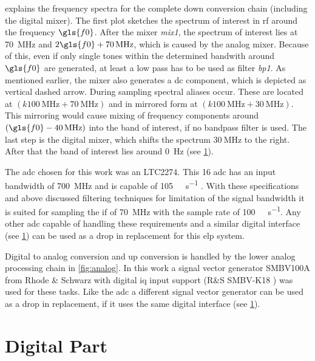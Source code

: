 \documentclass[12pt,a4paper,parskip=full,abstract=true,BCOR=12mm,twoside,open=right]{scrreprt}
\def\device#1{\textit{#1}}
\begin{document}
 explains the frequency spectra for the complete down
conversion chain (including the digital mixer). The first plot sketches the
spectrum of interest in \gls{rf} around the frequency $\gls{f0}$. After the mixer \device{mix1}, the
spectrum of interest lies at \SI{70}{\mega\hertz} and $2\gls{f0} + \SI{70}{\mega\hertz}$,
which is caused by the analog mixer. Because of this, even if only single tones
within the determined bandwith around $\gls{f0}$ are generated, at least a low pass
has to be used as filter \device{bp1}. As mentioned earlier, the mixer also generates a \gls{dc} component, which is depicted as vertical dashed arrow. During sampling spectral aliases occur. These
are located at $(k \SI{100}{\mega\hertz} + \SI{70}{\mega\hertz})$ and in mirrored form at
$(k \SI{100}{\mega\hertz} + \SI{30}{\mega\hertz})$. This mirroring would cause mixing
of frequency components around $(\gls{f0} - \SI{40}{\mega\hertz})$ into the band of interest,
if no bandpass filter is used. The last step is the digital mixer, which shifts
the spectrum $\SI{30}{\mega\hertz}$ to the right. After that the band of interest lies around
\SI{0}{\hertz} (see \cref{sec:digital}).

The \gls{adc} chosen for this work was an LTC2274. This \SI{16}{\bit} \gls{adc}
has an input bandwidth of \SI{700}{\mega\hertz} and is capable of
\SI{105}{\mega\samples\per\second} \cite{ltc2274}. With these specifications and above discussed filtering techniques for limitation of the signal bandwidth it
is suited for sampling the \gls{if} of \SI{70}{\mega\hertz} with the sample rate
of \SI{100}{\mega\samples\per\second}. Any other \gls{adc} capable of handling
these requirements and a similar digital interface (see \cref{sec:digital}) can be used as a drop in
replacement for this \gls{elp} system.

Digital to analog conversion and up conversion is handled by the lower analog
processing chain in \cref{fig:analog}. In this work a signal vector generator
SMBV100A from Rhode \& Schwarz with digital \gls{iq} input support (R\&S SMBV-K18
\cite{smbv_100a}) was used for these tasks. Like the \gls{adc} a different
signal vector generator can be used as a drop in replacement, if it uses
the same digital interface (see \cref{sec:digital}).


\section{Digital Part}
\label{sec:digital}
\end{document}
